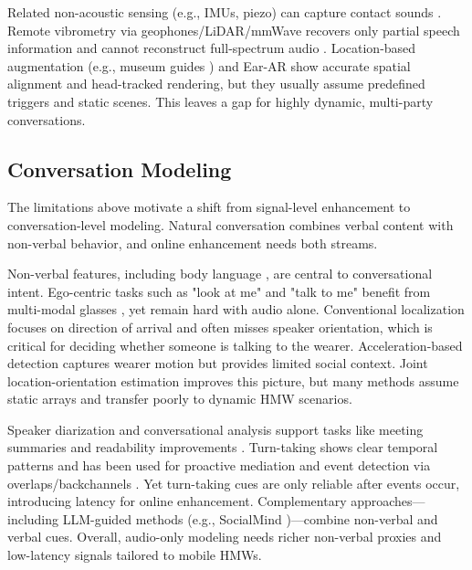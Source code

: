 Related non-acoustic sensing (e.g., IMUs, piezo) can capture contact sounds \cite{maruri2018v, khanna2021jawsense}. Remote vibrometry via geophones/LiDAR/mmWave recovers only partial speech information \cite{han2017pitchln, sami2020spying, li2020vocalprint} and cannot reconstruct full-spectrum audio \cite{anand2018speechless}. Location-based augmentation (e.g., museum guides \cite{harma2004augmented}) and Ear-AR \cite{yang2020ear} show accurate spatial alignment and head-tracked rendering, but they usually assume predefined triggers and static scenes. This leaves a gap for highly dynamic, multi-party conversations.

\subsection{Conversation Modeling}
The limitations above motivate a shift from signal-level enhancement to conversation-level modeling. Natural conversation combines verbal content with non-verbal behavior, and online enhancement needs both streams.

Non-verbal features, including body language \cite{d2010multimodal}, are central to conversational intent. Ego-centric tasks such as "look at me" and "talk to me" \cite{grauman2022ego4d} benefit from multi-modal glasses \cite{donley2021easycom}, yet remain hard with audio alone. Conventional localization focuses on direction of arrival \cite{wang2022nerc, yang2022deepear} and often misses speaker orientation, which is critical for deciding whether someone is talking to the wearer. Acceleration-based detection \cite{gedik2018detecting} captures wearer motion but provides limited social context. Joint location-orientation estimation \cite{ahuja2020direction} improves this picture, but many methods assume static arrays and transfer poorly to dynamic HMW scenarios.

Speaker diarization \cite{bredin2023pyannote} and conversational analysis \cite{wei2022conversational} support tasks like meeting summaries \cite{ramprasad2024analyzing} and readability improvements \cite{wang2024diarizationlm}. Turn-taking shows clear temporal patterns \cite{levinson2015timing} and has been used for proactive mediation \cite{lee2018flower} and event detection via overlaps/backchannels \cite{chen2024target, chang2022turn}. Yet turn-taking cues are only reliable after events occur, introducing latency for online enhancement. Complementary approaches—including LLM-guided methods (e.g., SocialMind \cite{yang2025socialmind})—combine non-verbal and verbal cues. Overall, audio-only modeling needs richer non-verbal proxies and low-latency signals tailored to mobile HMWs.

